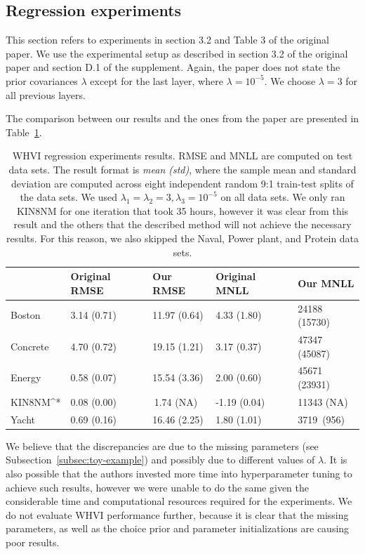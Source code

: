 \subsection{Regression experiments}\label{subsec:regression-experiments}
This section refers to experiments in section 3.2 and Table 3 of the original paper.
We use the experimental setup as described in section 3.2 of the original paper and section D.1 of the supplement.
Again, the paper does not state the prior covariances $\lambda$ except for the last layer, where $\lambda = 10^{-5}$.
We choose $\lambda = 3$ for all previous layers.

The comparison between our results and the ones from the paper are presented in Table~\ref{tab:regression-experiments}.
\begin{table}[]
    \begin{tabular}{l|llll}
               & Original RMSE  & Our RMSE &  Original MNLL  & Our MNLL \\ \hline
    Boston     & 3.14 (0.71)     & 11.97 (0.64) & { }4.33 (1.80)     & 24188 (15730) \\
    Concrete   & 4.70 (0.72)     & 19.15 (1.21) & { }3.17 (0.37)     & 47347 (45087) \\
    Energy     & 0.58 (0.07)     & 15.54 (3.36) & { }2.00 (0.60)     & 45671 (23931) \\
    KIN8NM^*   & 0.08 (0.00)     & { }\,1.74 (NA) & -1.19 (0.04)       & 11343 (NA) \\
    Yacht      & 0.69 (0.16)     & 16.46 (2.25) & { }1.80 (1.01)     & 3719 { }\,(956)
    \end{tabular}
    \caption{
        WHVI regression experiments results.
        RMSE and MNLL are computed on test data sets.
        The result format is \textit{mean (std)}, where the sample mean and standard deviation are computed across eight independent random 9:1 train-test splits of the data sets.
        We used $\lambda_1=\lambda_2=3,\lambda_3=10^{-5}$ on all data sets.
        We only ran KIN8NM for one iteration that took 35 hours, however it was clear from this result and the others that the described method will not achieve the necessary results.
        For this reason, we also skipped the Naval, Power plant, and Protein data sets.
    }
    \label{tab:regression-experiments}
\end{table}

We believe that the discrepancies are due to the missing parameters (see Subsection~\ref{subsec:toy-example}) and possibly due to different values of $\lambda$.
It is also possible that the authors invested more time into hyperparameter tuning to achieve such results, however we were unable to do the same given the considerable time and computational resources required for the experiments.
We do not evaluate WHVI performance further, because it is clear that the missing parameters, as well as the choice prior and parameter initializations are causing poor results.
